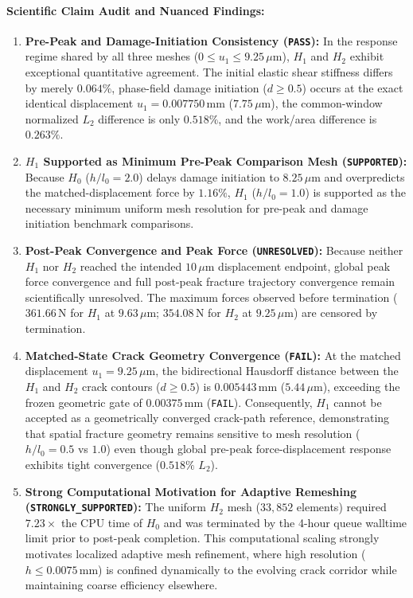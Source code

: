 \paragraph{Scientific Claim Audit and Nuanced Findings:}
\begin{enumerate}
    \item \textbf{Pre-Peak and Damage-Initiation Consistency (\texttt{PASS}):} In the response regime shared by all three meshes ($0 \le u_1 \le 9.25\,\mu\text{m}$), $H_1$ and $H_2$ exhibit exceptional quantitative agreement. The initial elastic shear stiffness differs by merely $\mathbf{0.064\%}$, phase-field damage initiation ($d \ge 0.5$) occurs at the exact identical displacement $u_1 = 0.007750\,\text{mm}$ ($7.75\,\mu\text{m}$), the common-window normalized $L_2$ difference is only $\mathbf{0.518\%}$, and the work/area difference is $\mathbf{0.263\%}$.
    \item \textbf{$H_1$ Supported as Minimum Pre-Peak Comparison Mesh (\texttt{SUPPORTED}):} Because $H_0$ ($h/l_0 = 2.0$) delays damage initiation to $8.25\,\mu\text{m}$ and overpredicts the matched-displacement force by $1.16\%$, $H_1$ ($h/l_0 = 1.0$) is supported as the necessary minimum uniform mesh resolution for pre-peak and damage initiation benchmark comparisons.
    \item \textbf{Post-Peak Convergence and Peak Force (\texttt{UNRESOLVED}):} Because neither $H_1$ nor $H_2$ reached the intended $10\,\mu\text{m}$ displacement endpoint, global peak force convergence and full post-peak fracture trajectory convergence remain scientifically unresolved. The maximum forces observed before termination ($361.66\,\text{N}$ for $H_1$ at $9.63\,\mu\text{m}$; $354.08\,\text{N}$ for $H_2$ at $9.25\,\mu\text{m}$) are censored by termination.
    \item \textbf{Matched-State Crack Geometry Convergence (\texttt{FAIL}):} At the matched displacement $u_1 = 9.25\,\mu\text{m}$, the bidirectional Hausdorff distance between the $H_1$ and $H_2$ crack contours ($d \ge 0.5$) is $0.005443\,\text{mm}$ ($5.44\,\mu\text{m}$), exceeding the frozen geometric gate of $0.00375\,\text{mm}$ (\texttt{FAIL}). Consequently, $H_1$ cannot be accepted as a geometrically converged crack-path reference, demonstrating that spatial fracture geometry remains sensitive to mesh resolution ($h/l_0 = 0.5$ vs $1.0$) even though global pre-peak force-displacement response exhibits tight convergence ($0.518\%$ $L_2$).
    \item \textbf{Strong Computational Motivation for Adaptive Remeshing (\texttt{STRONGLY\_SUPPORTED}):} The uniform $H_2$ mesh ($33,852$ elements) required $7.23\times$ the CPU time of $H_0$ and was terminated by the 4-hour queue walltime limit prior to post-peak completion. This computational scaling strongly motivates localized adaptive mesh refinement, where high resolution ($h \le 0.0075\,\text{mm}$) is confined dynamically to the evolving crack corridor while maintaining coarse efficiency elsewhere.
\end{enumerate}



